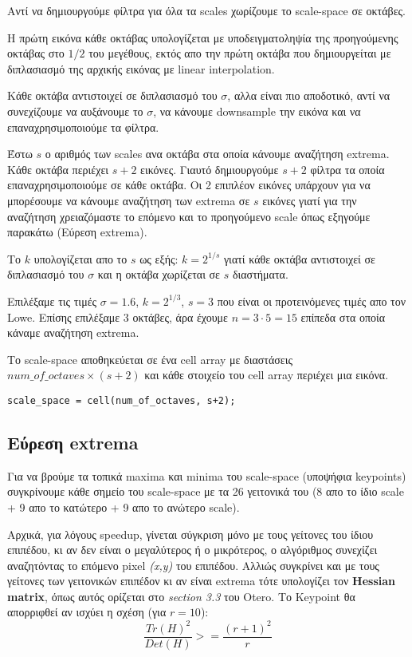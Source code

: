 \documentclass[11pt]{scrartcl} %
\begin{document}
Αντί να δημιουργούμε φίλτρα για όλα τα scales χωρίζουμε το scale-space σε οκτάβες.

Η πρώτη εικόνα κάθε οκτάβας υπολογίζεται με υποδειγματοληψία της προηγούμενης οκτάβας στο $1/2$ του μεγέθους, εκτός απο την πρώτη οκτάβα που δημιουργείται με διπλασιασμό της αρχικής εικόνας με linear interpolation.

Κάθε οκτάβα αντιστοιχεί σε διπλασιασμό του $\sigma$, αλλα είναι πιο αποδοτικό, αντί να συνεχίζουμε να αυξάνουμε το $\sigma$, να κάνουμε downsample την εικόνα και να επαναχρησιμοποιούμε τα φίλτρα.

Έστω $s$ ο αριθμός των scales ανα οκτάβα στα οποία κάνουμε αναζήτηση extrema.
Κάθε οκτάβα περιέχει $s+2$ εικόνες. Γιαυτό δημιουργούμε $s+2$ φίλτρα τα οποία επαναχρησιμοποιούμε σε κάθε οκτάβα.
Οι 2 επιπλέον εικόνες υπάρχουν για να μπορέσουμε να κάνουμε αναζήτηση των extrema σε $s$ εικόνες γιατί για την αναζήτηση χρειαζόμαστε το επόμενο και το προηγούμενο scale όπως εξηγούμε παρακάτω (Εύρεση extrema).

Το $k$ υπολογίζεται απο το $s$ ως εξής: $k = 2^{1/s}$ γιατί κάθε οκτάβα αντιστοιχεί σε διπλασιασμό του $\sigma$ και η οκτάβα χωρίζεται σε $s$ διαστήματα.

Επιλέξαμε τις τιμές $\sigma = 1.6$, $k = 2^{1/3}$, $s = 3$ που είναι οι προτεινόμενες τιμές απο τον Lowe\cite{lowe}.
Επίσης επιλέξαμε $3$ οκτάβες, άρα έχουμε $n = 3 \cdot 5 = 15$ επίπεδα στα οποία κάναμε αναζήτηση extrema.

Το scale-space αποθηκεύεται σε ένα cell array με διαστάσεις $num\_of\_octaves \times (s+2)$ και κάθε στοιχείο του cell array περιέχει μια εικόνα.
\begin{verbatim}
scale_space = cell(num_of_octaves, s+2);
\end{verbatim}

\subsection{Εύρεση extrema}

Για να βρούμε τα τοπικά maxima και minima του scale-space (υποψήφια keypoints) συγκρίνουμε κάθε σημείο του scale-space
με τα 26 γειτονικά του (8 απο το ίδιο scale + 9 απο το κατώτερο + 9 απο το ανώτερο scale).

Αρχικά, για λόγους speedup, γίνεται σύγκριση μόνο με τους γείτονες του ίδιου επιπέδου, κι αν δεν είναι ο μεγαλύτερος ή ο
μικρότερος, ο αλγόριθμος συνεχίζει αναζητόντας το επόμενο pixel \textit{(x,y)} του επιπέδου. Αλλιώς συγκρίνει και με τους
γείτονες των γειτονικών επιπέδον κι αν είναι extrema τότε υπολογίζει τον \textbf{Hessian matrix}, όπως αυτός ορίζεται στο
\textit{section 3.3} του Otero\cite{otero}. Το Keypoint θα απορριφθεί αν ισχύει η σχέση (για $r = 10$):
\[\frac{Tr(H)^2}{Det(H)} >= \frac{(r+1)^2}{r}\]
\end{document}
